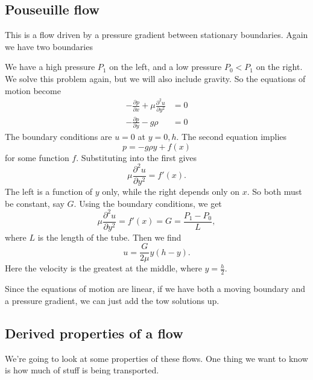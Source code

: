 \documentclass[a4paper]{article}
\begin{document}
\subsection{Pouseuille flow}
This is a flow driven by a pressure gradient between stationary boundaries. Again we have two boundaries
\begin{center}
\end{center}
We have a high pressure $P_1$ on the left, and a low pressure $P_0 < P_1$ on the right. We solve this problem again, but we will also include gravity. So the equations of motion become
\begin{align*}
  -\frac{\partial p}{\partial x} + \mu\frac{\partial^2 u}{\partial y^2} &= 0\\
  -\frac{\partial p}{\partial y} - g\rho &= 0
\end{align*}
The boundary conditions are $u = 0$ at $y = 0, h$. The second equation implies
\[
  p =- g\rho y + f(x)
\]
for some function $f$. Substituting into the first gives
\[
  \mu\frac{\partial^2 u}{\partial y^2} = f'(x).
\]
The left is a function of $y$ only, while the right depends only on $x$. So both must be constant, say $G$. Using the boundary conditions, we get
\[
  \mu\frac{\partial^2 u}{\partial y^2} = f'(x) = G = \frac{P_1 - P_0}{L},
\]
where $L$ is the length of the tube. Then we find
\[
  u = \frac{G}{2 \mu} y(h - y).
\]
Here the velocity is the greatest at the middle, where $y = \frac{h}{2}$.

Since the equations of motion are linear, if we have both a moving boundary and a pressure gradient, we can just add the tow solutions up.

\subsection{Derived properties of a flow}
We're going to look at some properties of these flows. One thing we want to know is how much of stuff is being transported.
\end{document}
